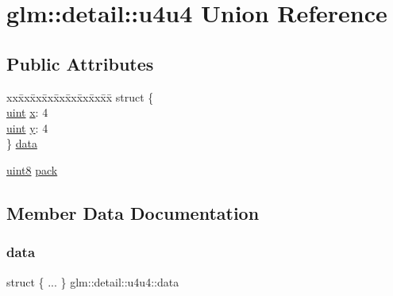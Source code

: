 \hypertarget{unionglm_1_1detail_1_1u4u4}{}\section{glm\+:\+:detail\+:\+:u4u4 Union Reference}
\label{unionglm_1_1detail_1_1u4u4}
\subsection*{Public Attributes}
\begin{DoxyCompactItemize}
\item 
\begin{tabbing}
xx\=xx\=xx\=xx\=xx\=xx\=xx\=xx\=xx\=\kill
struct \{\\
\>\mbox{\hyperlink{group__core__precision_ga4fd29415871152bfb5abd588334147c8}{uint}} \mbox{\hyperlink{unionglm_1_1detail_1_1u4u4_a488b94e524db2319dd7801ef632ef7f1}{x}}: 4\\
\>\mbox{\hyperlink{group__core__precision_ga4fd29415871152bfb5abd588334147c8}{uint}} \mbox{\hyperlink{unionglm_1_1detail_1_1u4u4_a397ae8c3903b0fd4fe9c88617607f7af}{y}}: 4\\
\} \mbox{\hyperlink{unionglm_1_1detail_1_1u4u4_acb55a563954be88eeb432d3b96720712}{data}}\\

\end{tabbing}\item 
\mbox{\hyperlink{namespaceglm_1_1detail_aef2588f97d090cc19fbbe0c74fe17c8f}{uint8}} \mbox{\hyperlink{unionglm_1_1detail_1_1u4u4_a823a2e3d7ae6e4710c0ceb40e191ef7b}{pack}}
\end{DoxyCompactItemize}


\subsection{Member Data Documentation}
\mbox{\label{unionglm_1_1detail_1_1u4u4_acb55a563954be88eeb432d3b96720712}} 
\subsubsection{\texorpdfstring{data}{data}}
{\footnotesize\ttfamily struct \{ ... \}   glm\+::detail\+::u4u4\+::data}

\mbox{\label{unionglm_1_1detail_1_1u4u4_a823a2e3d7ae6e4710c0ceb40e191ef7b}} 
